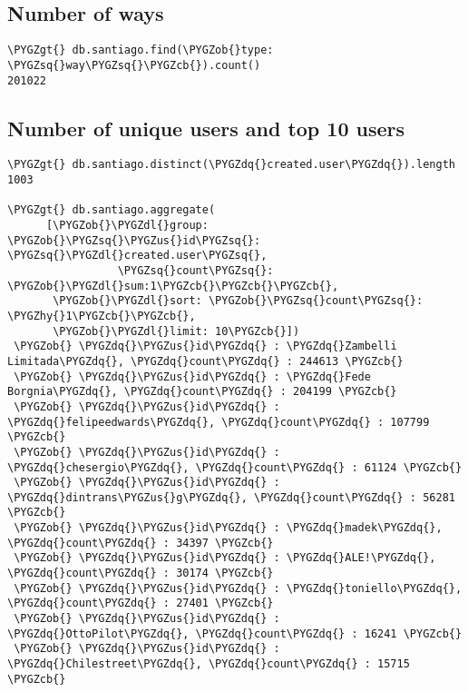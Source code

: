 \documentclass[a4paper,10pt,english]{sphinxhowto}
\def\PYGZus{\char`\_}
\def\PYGZob{\char`\{}
\def\PYGZcb{\char`\}}
\def\PYGZgt{\char`\>}
\def\PYGZdl{\char`\$}
\def\PYGZhy{\char`\-}
\def\PYGZsq{\char`\'}
\def\PYGZdq{\char`\"}
\renewcommand\PYGZsq{\textquotesingle}
\begin{document}
\subsection{Number of ways}
\label{index:number-of-ways}
\begin{Verbatim}[commandchars=\\\{\}]
\PYGZgt{} db.santiago.find(\PYGZob{}type: \PYGZsq{}way\PYGZsq{}\PYGZcb{}).count()
201022
\end{Verbatim}


\subsection{Number of unique users and top 10 users}
\label{index:number-of-unique-users-and-top-10-users}
\begin{Verbatim}[commandchars=\\\{\}]
\PYGZgt{} db.santiago.distinct(\PYGZdq{}created.user\PYGZdq{}).length
1003

\PYGZgt{} db.santiago.aggregate(
      [\PYGZob{}\PYGZdl{}group: \PYGZob{}\PYGZsq{}\PYGZus{}id\PYGZsq{}: \PYGZsq{}\PYGZdl{}created.user\PYGZsq{},
                 \PYGZsq{}count\PYGZsq{}: \PYGZob{}\PYGZdl{}sum:1\PYGZcb{}\PYGZcb{}\PYGZcb{},
       \PYGZob{}\PYGZdl{}sort: \PYGZob{}\PYGZsq{}count\PYGZsq{}: \PYGZhy{}1\PYGZcb{}\PYGZcb{},
       \PYGZob{}\PYGZdl{}limit: 10\PYGZcb{}])
 \PYGZob{} \PYGZdq{}\PYGZus{}id\PYGZdq{} : \PYGZdq{}Zambelli Limitada\PYGZdq{}, \PYGZdq{}count\PYGZdq{} : 244613 \PYGZcb{}
 \PYGZob{} \PYGZdq{}\PYGZus{}id\PYGZdq{} : \PYGZdq{}Fede Borgnia\PYGZdq{}, \PYGZdq{}count\PYGZdq{} : 204199 \PYGZcb{}
 \PYGZob{} \PYGZdq{}\PYGZus{}id\PYGZdq{} : \PYGZdq{}felipeedwards\PYGZdq{}, \PYGZdq{}count\PYGZdq{} : 107799 \PYGZcb{}
 \PYGZob{} \PYGZdq{}\PYGZus{}id\PYGZdq{} : \PYGZdq{}chesergio\PYGZdq{}, \PYGZdq{}count\PYGZdq{} : 61124 \PYGZcb{}
 \PYGZob{} \PYGZdq{}\PYGZus{}id\PYGZdq{} : \PYGZdq{}dintrans\PYGZus{}g\PYGZdq{}, \PYGZdq{}count\PYGZdq{} : 56281 \PYGZcb{}
 \PYGZob{} \PYGZdq{}\PYGZus{}id\PYGZdq{} : \PYGZdq{}madek\PYGZdq{}, \PYGZdq{}count\PYGZdq{} : 34397 \PYGZcb{}
 \PYGZob{} \PYGZdq{}\PYGZus{}id\PYGZdq{} : \PYGZdq{}ALE!\PYGZdq{}, \PYGZdq{}count\PYGZdq{} : 30174 \PYGZcb{}
 \PYGZob{} \PYGZdq{}\PYGZus{}id\PYGZdq{} : \PYGZdq{}toniello\PYGZdq{}, \PYGZdq{}count\PYGZdq{} : 27401 \PYGZcb{}
 \PYGZob{} \PYGZdq{}\PYGZus{}id\PYGZdq{} : \PYGZdq{}OttoPilot\PYGZdq{}, \PYGZdq{}count\PYGZdq{} : 16241 \PYGZcb{}
 \PYGZob{} \PYGZdq{}\PYGZus{}id\PYGZdq{} : \PYGZdq{}Chilestreet\PYGZdq{}, \PYGZdq{}count\PYGZdq{} : 15715 \PYGZcb{}
\end{Verbatim}
\end{document}
